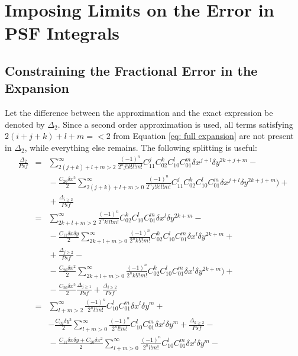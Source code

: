 \documentclass{article}
\begin{document}
\section{Imposing Limits on the Error in PSF Integrals}
\subsection{Constraining the Fractional Error in the Expansion}
\label{sec: expansion error}
Let the difference between the approximation and the exact expression be 
denoted by $\Delta_2$. Since a second order approximation is used, all terms
satisfying $2(i+j+k)+l+m=<2$ from Equation \ref{eq: full expansion} are not
present in $\Delta_2$, while everything else remains. The following splitting
is useful:
\begin{eqnarray}
	\frac{\Delta_2}{Psf}&=&\sum_{2(j+k)+l+m>2}^{\infty}\frac{(-1)^n}{2^n j!k!l!m!}
	C_{11}^j C_{02}^k C_{10}^l C_{01}^m \delta x^{j+l} \delta y^{2k+j+m}-
	\nonumber\\
	&&{}-\frac{C_{20}\delta x^2}{2}\sum_{2(j+k)+l+m>0}^{\infty}
	\frac{(-1)^n}{2^n j!k!l!m!}
		C_{11}^j C_{02}^k C_{10}^l C_{01}^m 
		\delta x^{j+l} \delta y^{2k+j+m}\Big)+\nonumber\\
	&&{}+\frac{\Delta_{i\ge2}}{Psf}\\
%
	&=&\sum_{2k+l+m>2}^{\infty}\frac{(-1)^n}{2^n k!l!m!}
	C_{02}^k C_{10}^l C_{01}^m \delta x^l \delta y^{2k+m}-
	\nonumber\\
	&&{}-\frac{C_{11}\delta x\delta y}{2}
	\sum_{2k+l+m>0}^{\infty}\frac{(-1)^n}{2^n k!l!m!}
	C_{02}^k C_{10}^l C_{01}^m \delta x^l \delta y^{2k+m}+\nonumber\\
	&&{}+\frac{\Delta_{j\ge2}}{Psf}-
	\nonumber\\
	&&{}-\frac{C_{20}\delta x^2}{2}\sum_{2k+l+m>0}^{\infty}
	\frac{(-1)^n}{2^n k!l!m!} C_{02}^k C_{10}^l C_{01}^m 
		\delta x^l \delta y^{2k+m}\Big)+\nonumber\\
	&&{}-\frac{C_{20}\delta x^2}{2}\frac{\Delta_{j\ge1}}{Psf} 
	+\frac{\Delta_{i\ge2}}{Psf}\\
%
	&=&\sum_{l+m>2}^{\infty}\frac{(-1)^n}{2^n l!m!}
	C_{10}^l C_{01}^m \delta x^l \delta y^m+
	\nonumber\\
	&&-\frac{C_{02}\delta y^2}{2}\sum_{l+m>0}^{\infty}
	\frac{(-1)^n}{2^n l!m!} C_{10}^l C_{01}^m \delta x^l \delta y^m+
	\frac{\Delta_{k\ge2}}{Psf}-\nonumber\\
	&&{}-\frac{C_{11}\delta x\delta y+C_{20}\delta x^2}{2}
	\sum_{l+m>0}^{\infty}\frac{(-1)^n}{2^n l!m!}
	C_{10}^l C_{01}^m \delta x^l \delta y^m-\nonumber\\

\end{eqnarray}
\end{document}
